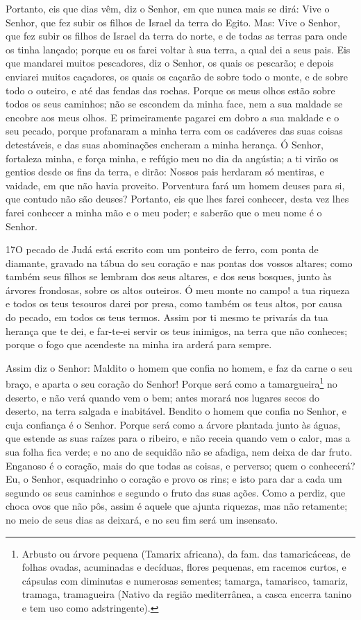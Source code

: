 Portanto, eis que dias vêm, diz o Senhor, em que nunca mais se
dirá: Vive o Senhor, que fez subir os filhos de Israel da terra do
Egito. Mas: Vive o Senhor, que fez subir os filhos de Israel
da terra do norte, e de todas as terras para onde os tinha lançado;
porque eu os farei voltar à sua terra, a qual dei a seus pais.
Eis que mandarei muitos pescadores, diz o Senhor, os quais os
pescarão; e depois enviarei muitos caçadores, os quais os caçarão de
sobre todo o monte, e de sobre todo o outeiro, e até das fendas das
rochas. Porque os meus olhos estão sobre todos os seus
caminhos; não se escondem da minha face, nem a sua maldade se
encobre aos meus olhos. E primeiramente pagarei em dobro a
sua maldade e o seu pecado, porque profanaram a minha terra com os
cadáveres das suas coisas detestáveis, e das suas abominações
encheram a minha herança. Ó Senhor, fortaleza minha, e força
minha, e refúgio meu no dia da angústia; a ti virão os gentios desde
os fins da terra, e dirão: Nossos pais herdaram só mentiras, e
vaidade, em que não havia proveito. Porventura fará um homem
deuses para si, que contudo não são deuses? Portanto, eis que
lhes farei conhecer, desta vez lhes farei conhecer a minha mão e o
meu poder; e saberão que o meu nome é o Senhor.

\medskip

\lettrine{17} O pecado de Judá está escrito com um ponteiro de
ferro, com ponta de diamante, gravado na tábua do seu coração e nas
pontas dos vossos altares; como também seus filhos se lembram
dos seus altares, e dos seus bosques, junto às árvores frondosas,
sobre os altos outeiros. Ó meu monte no campo! a tua riqueza e
todos os teus tesouros darei por presa, como também os teus altos,
por causa do pecado, em todos os teus termos. Assim por ti mesmo
te privarás da tua herança que te dei, e far-te-ei servir os teus
inimigos, na terra que não conheces; porque o fogo que acendeste na
minha ira arderá para sempre.

Assim diz o Senhor: Maldito o homem que confia no homem, e faz da
carne o seu braço, e aparta o seu coração do Senhor! Porque será
como a tamargueira\footnote{Arbusto ou árvore pequena (Tamarix
africana), da fam. das tamaricáceas, de folhas ovadas, acuminadas e
decíduas, flores pequenas, em racemos curtos, e cápsulas com
diminutas e numerosas sementes; tamarga, tamarisco, tamariz,
tramaga, tramagueira (Nativo da região mediterrânea, a casca encerra
tanino e tem uso como adstringente).} no deserto, e não verá quando
vem o bem; antes morará nos lugares secos do deserto, na terra
salgada e inabitável. Bendito o homem que confia no Senhor, e
cuja confiança é o Senhor. Porque será como a árvore plantada
junto às águas, que estende as suas raízes para o ribeiro, e não
receia quando vem o calor, mas a sua folha fica verde; e no ano de
sequidão não se afadiga, nem deixa de dar fruto. Enganoso é o
coração, mais do que todas as coisas, e perverso; quem o conhecerá?
Eu, o Senhor, esquadrinho o coração e provo os rins; e isto
para dar a cada um segundo os seus caminhos e segundo o fruto das
suas ações. Como a perdiz, que choca ovos que não pôs, assim
é aquele que ajunta riquezas, mas não retamente; no meio de seus
dias as deixará, e no seu fim será um insensato.

